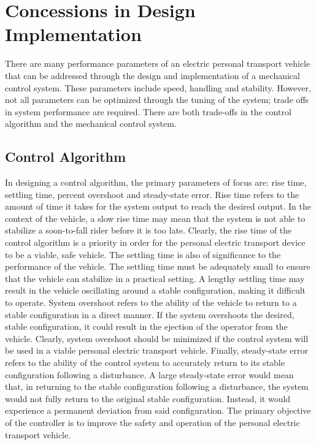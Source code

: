 \section{Concessions in Design Implementation} \label{sec:Tradeoff}
There are many performance parameters of an electric personal transport vehicle that can be addressed through the design and implementation of a mechanical control system. 
These parameters include speed, handling and stability. 
However, not all parameters can be optimized through the tuning of the system; trade offs in system performance are required. 
There are both trade-offs in the control algorithm and the mechanical control system.

\subsection{Control Algorithm} 
In designing a control algorithm, the primary parameters of focus are: rise time, settling time, percent overshoot and steady-state error. \cite{LQRpar}
Rise time refers to the amount of time it takes for the system output to reach the desired output. 
In the context of the vehicle, a slow rise time may mean that the system is not able to stabilize a soon-to-fall rider before it is too late. 
Clearly, the rise time of the control algorithm is a priority in order for the personal electric transport device to be a viable, safe vehicle.
The settling time is also of significance to the performance of the vehicle. 
The settling time must be adequately small to ensure that the vehicle can stabilize in a practical setting. 
A lengthy settling time may result in the vehicle oscillating around a stable configuration, making it difficult to operate. 
System overshoot refers to the ability of the vehicle to return to a stable configuration in a direct manner. 
If the system overshoots the desired, stable configuration, it could result in the ejection of the operator from the vehicle. 
Clearly, system overshoot should be minimized if the control system will be used in a viable personal electric transport vehicle. 
Finally, steady-state error refers to the ability of the control system to accurately return to its stable configuration following a disturbance. 
A large steady-state error would mean that, in returning to the stable configuration following a disturbance, the system would not fully return to the original stable configuration. 
Instead, it would experience a permanent deviation from said configuration. 
The primary objective of the controller is to improve the safety and operation of the personal electric transport vehicle. 
